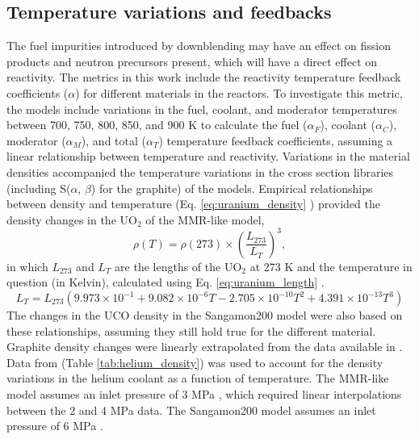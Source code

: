\subsection{Temperature variations and feedbacks}
The fuel impurities introduced by downblending may have an effect on 
fission products and neutron precursors present, which will have 
a direct effect on reactivity. 
The metrics in this work include the reactivity temperature feedback 
coefficients ($\alpha$) for different materials in the 
reactors. To investigate this metric, the models include 
variations in the fuel, coolant, and moderator temperatures 
between 700, 750, 800, 850, and 900 K to calculate the fuel 
($\alpha_F$), coolant ($\alpha_C$), moderator ($\alpha_M$), 
and total ($\alpha_T$) temperature feedback coefficients, assuming a linear 
relationship between temperature and reactivity. Variations 
in the material densities accompanied the 
temperature variations in the cross section libraries 
(including S($\alpha$, $\beta$) for the graphite) of 
the models. Empirical relationships 
between density and temperature (Eq. \ref{eq:uranium_density} 
\cite{fink_thermophysical_2000}) provided the density 
changes in the UO$_2$ of the \gls*{MMR}-like model,
\begin{equation}\label{eq:uranium_density}
    \rho(T) = \rho(273)\times\left(\frac{L_{273}}{L_T}\right)^3,
\end{equation}
in which $L_{273}$ and $L_T$ are the lengths of the UO$_2$ at 
273 K and the temperature in question (in Kelvin), calculated 
using Eq. \ref{eq:uranium_length} \cite{fink_thermophysical_2000}.
\begin{equation}\label{eq:uranium_length}
    L_T = L_{273}(9.973\times10^{-1} + 9.082\times10^{-6}T
    -2.705\times10^{-10}T^2 + 4.391\times10^{-13}T^3)
\end{equation}
The changes in 
the UCO density in the Sangamon200 model were also based on 
these relationships, assuming they still hold true for the 
different material. 
Graphite density changes were linearly extrapolated from the 
data available in \cite{mceligot_thermal_2016}. 
Data from \cite{petersen_properties_1970} (Table 
\ref{tab:helium_density}) was used to account for the density 
variations in the helium coolant as a function of temperature. 
The \gls*{MMR}-like model assumes an inlet pressure of 3 MPa 
\cite{noauthor_usnc_2021}, which required linear interpolations 
between the 2 and 4 MPa data. The Sangamon200 model assumes 
an inlet pressure of 6 MPa \cite{mulder_overview_2021}.

